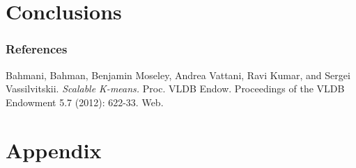\documentclass{article} %
\begin{document}
\section{Conclusions}
\label{headings}

\clearpage
\newpage

\subsubsection*{References}

Bahmani, Bahman, Benjamin Moseley, Andrea Vattani, Ravi Kumar, and Sergei Vassilvitskii. \textit{Scalable K-means.} Proc. VLDB Endow. Proceedings of the VLDB Endowment 5.7 (2012): 622-33. Web.


\clearpage
\newpage

\section{Appendix}
\label{headings}
\end{document}
